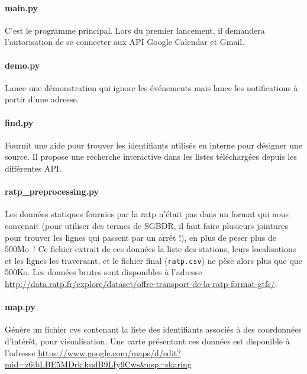 \documentclass[a4paper, 8pt]{article}
\begin{document}
\paragraph{main.py} C'est le programme principal. Lors du premier lancement,
il demandera l'autorisation de se connecter aux API Google Calendar et Gmail.

\paragraph{demo.py} Lance une démonstration qui ignore les événements mais lance
les notifications à partir d'une adresse.

\paragraph{find.py} Fournit une aide pour trouver les identifiants utilisés en
interne pour désigner une source.
Il propose une recherche interactive dans les listes téléchargées depuis les
différentes API.

\paragraph{ratp\_preprocessing.py} Les données statiques fournies par la ratp
n'était pas dans un format qui nous convenait (pour utiliser des termes de SGBDR,
il faut faire plusieurs jointures pour trouver les lignes qui passent par un
arrêt !), en plus de peser plus de 500Mo~!
Ce fichier extrait de ces données la liste des stations, leurs localisations et
les lignes les traversant, et le fichier final (\texttt{ratp.csv}) ne pèse alors
plus que que 500Ko.
Les données brutes sont disponibles à l'adresse
\url{http://data.ratp.fr/explore/dataset/offre-transport-de-la-ratp-format-gtfs/}.

\paragraph{map.py} Génère un fichier cvs contenant la liste des identifiants
associés à des coordonnées d'intérêt, pour visualisation.
Une carte présentant ces données est disponible à l'adresse
\url{https://www.google.com/maps/d/edit?mid=z6ibLBE5MDrk.kudB9LIy9Cws&usp=sharing}
\end{document}

